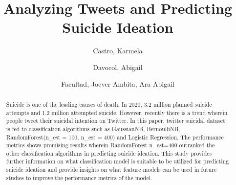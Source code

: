 \documentclass[runningheads]{llncs}
\begin{document}
\pagestyle{fancy}
\fancyhead{} %
\renewcommand{\headrulewidth}{0pt} %
\fancyfoot{} %
\rfoot{\thepage}           %


\title{Analyzing Tweets and Predicting Suicide Ideation}
%
%
\author{Castro, Karmela\and Davocol, Abigail\and
Facultad, Joever Ambita, Ara Abigail  }
%

%

%
\maketitle              %
%
\begin{abstract} Suicide is one of the leading causes of death. In 2020, 3.2 million planned suicide attempts and 1.2 million attempted suicide. However, recently there is a trend wherein people tweet their suicidal intention on Twitter. In this paper, twitter suicidal dataset is fed to classification algorithms such as GaussianNB, BernoulliNB, RandomForest(n\_est = 100, n\_est = 400) and Logistic Regression. The performance metrics shows promising results wherein RandomForest n\_est=400 outranked the other classification algorithms in predicting suicide ideation. This study provides further information on what classification model is suitable to be utilized for predicting suicide ideation and provide insights on what feature models can be used in future studies to improve the performance metrics of the model.


\end{abstract}
%
%
%
\end{document}
